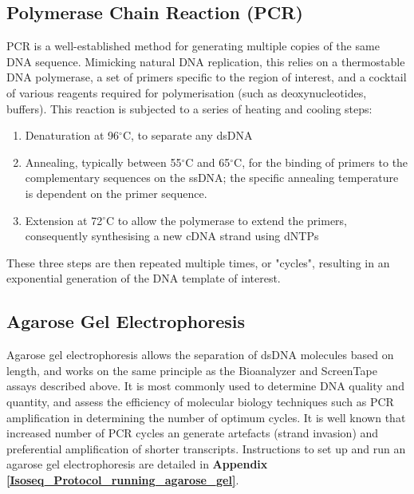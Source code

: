 \subsection{Polymerase Chain Reaction (PCR)}
\label{section:ch2_PCR_explanation} 
PCR is a well-established method for generating multiple copies of the same DNA sequence. Mimicking natural DNA replication, this relies on a thermostable DNA polymerase, a set of primers specific to the region of interest, and a cocktail of various reagents required for polymerisation (such as deoxynucleotides, buffers). This reaction is subjected to a series of heating and cooling steps: 
\begin{enumerate}
	\item Denaturation at 96$^{\circ}$C, to separate any dsDNA 
	\item Annealing, typically between 55$^{\circ}$C  and 65$^{\circ}$C, for the binding of primers to the complementary sequences on the ssDNA; the specific annealing temperature is dependent on the primer sequence. 
	\item Extension at 72$^{\circ}$C to allow the polymerase to extend the primers, consequently synthesising a new cDNA strand using dNTPs
\end{enumerate} 
These three steps are then repeated multiple times, or "cycles", resulting in an exponential generation of the DNA template of interest.

\subsection{Agarose Gel Electrophoresis}
\label{section:ch2_agarose_explanation}  
Agarose gel electrophoresis allows the separation of dsDNA molecules based on length, and works on the same principle as the Bioanalyzer and ScreenTape assays described above. It is most commonly used to determine DNA quality and quantity, and assess the efficiency of molecular biology techniques such as PCR amplification in determining the number of optimum cycles. It is well known that increased number of PCR cycles an generate artefacts (strand invasion) and preferential amplification of shorter transcripts\cite{Acinas2005,Bayega2018}. Instructions to set up and run an agarose gel electrophoresis are detailed in \textbf{Appendix \ref{Isoseq_Protocol_running_agarose_gel}}.


